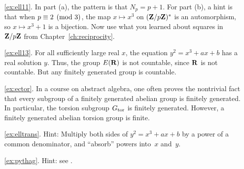 \begin{itemize}
\begin{enumerate}
\item[\ref{ex:ell11}.]  In part (a), the pattern is that $N_p=p+1$.
For part (b), a hint is that when $p\equiv 2\pmod{3}$,
the map $x\mapsto x^3$ on $(\mathbf{Z}/p\mathbf{Z}{})^*$ is an automorphism,
so $x\mapsto x^3+1$ is a bijection.  Now use what you learned
about squares in $\mathbf{Z}/p\mathbf{Z}{}$ from Chapter~\ref{ch:reciprocity}.

\item[\ref{ex:ell13}.] For all sufficiently large real $x$, the
equation $y^2=x^3+ax+b$ has a real solution $y$.  Thus, the
group $E(\mathbf{R})$ is not countable, since $\mathbf{R}$ is not countable.
But any finitely generated group is countable.

\item[\ref{ex:ector}.] In a course on abstract algebra, one often
  proves the nontrivial fact that every subgroup of a finitely
  generated abelian group is finitely generated.  In particular, the
  torsion subgroup $G_{\operatorname{tor}}$ is finitely generated.  However, a
  finitely generated abelian torsion group is finite.

\item[\ref{ex:elltrans}.]
Hint: Multiply both sides of $y^2=x^3+ax+b$ by a power of a common
denominator, and ``absorb'' powers into~$x$ and~$y$.

\item[\ref{ex:pythag}.] Hint: see .

\end{enumerate}


\end{itemize}
